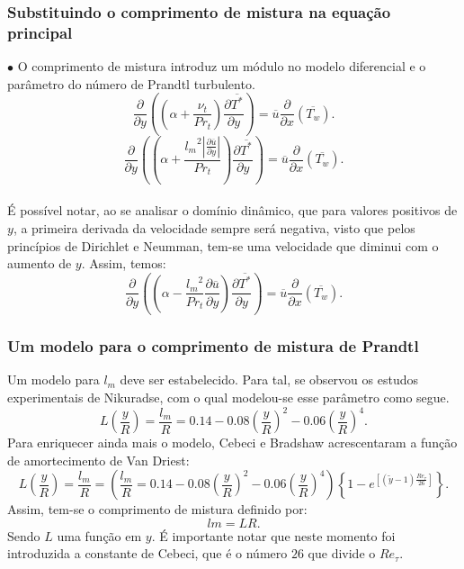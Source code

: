 \documentclass[xcolor=dvipsnames,10pt,aspectratio=169]{beamer}
\begin{document}
		\begin{frame}
			\frametitle{Substituindo o comprimento de mistura na equação principal}	
			$\bullet$ O comprimento de mistura introduz um módulo no modelo diferencial e o parâmetro do número de Prandtl turbulento.   
			\\
				\begin{equation}
				{\frac{\partial{}}{\partial{y}}} \left( \left( \alpha   
				+ \frac{\nu_t}{Pr_t} \right) \frac{\partial \overline{T^\ast}}{\partial y} \right)
				= 
				\overline{u}\frac{\partial{}}{\partial{x}}\left(\overline{T_w}\right)  .
				\end{equation}
			\begin{equation}
			{\frac{\partial{}}{\partial{y}}} \left( \left( \alpha   
			+ \frac{{l_m}^2 \left| \frac{\partial \overline{u}}{\partial y} \right|}{Pr_t} \right) \frac{\partial \overline{T^\ast}}{\partial y} \right)
			= 
			\overline{u}\frac{\partial{}}{\partial{x}}\left(\overline{T_w}\right)  .
			\end{equation}
		\\
		É possível notar, ao se analisar o domínio dinâmico, que para valores positivos de $ y $, a primeira derivada da velocidade sempre será negativa, visto que pelos princípios de Dirichlet e Neumman, tem-se uma velocidade que diminui com o aumento de $ y $. Assim, temos:\\
			\begin{equation}
			{\frac{\partial{}}{\partial{y}}} \left( \left( \alpha   
			- \frac{{l_m}^2}{Pr_t}\frac{\partial \overline{u}}{\partial y} \right) \frac{\partial \overline{T^\ast}}{\partial y} \right)
			= 
			\overline{u}\frac{\partial{}}{\partial{x}}\left(\overline{T_w}\right)  .
			\end{equation}
		\end{frame}	
	
	
	
	
		\begin{frame}
			\frametitle{Um modelo para o comprimento de mistura de Prandtl}
			Um modelo para $l_m$ deve ser estabelecido. Para tal, se observou os estudos experimentais de Nikuradse, com o qual modelou-se esse parâmetro como segue.
			\begin{equation}
			L\left(\frac{y}{R}\right) = \frac{l_m}{R} = 0.14 - 0.08 \left(\frac{y}{R}\right)^2 - 0.06\left(\frac{y}{R}\right)^4.
			\end{equation}
			Para enriquecer ainda mais o modelo, Cebeci e Bradshaw acrescentaram a função de amortecimento de Van Driest:
			\begin{equation}
			L\left(\frac{y}{R}\right)  = \frac{l_m}{R} = \left(\frac{l_m}{R} = 0.14 - 0.08 \left(\frac{y}{R}\right)^2 - 0.06\left(\frac{y}{R}\right)^4\right)\left\{  1 - e^{[(\tilde{y} - 1) \frac{Re_\tau}{26}]}\right\}.
			\end{equation}
			Assim, tem-se o comprimento de mistura definido por:
			\begin{equation}
			lm = L R.
			\end{equation}
			Sendo $ L $ uma função em $ y $. É importante notar que neste momento foi introduzida a constante de Cebeci, que é o número $ 26 $ que divide o $ Re_\tau $.
		\end{frame}
		
\end{document}
